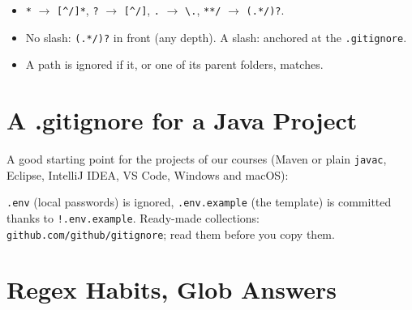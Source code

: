 \documentclass[11pt,a4paper]{article}
\begin{document}

\begin{itemize}
  \item \texttt{*} $\to$ \texttt{[\textasciicircum/]*}, \texttt{?} $\to$ \texttt{[\textasciicircum/]}, \texttt{.} $\to$ \texttt{\textbackslash.}, \texttt{**/} $\to$ \texttt{(.*/)?}.
  \item No slash: \texttt{(.*/)?} in front (any depth). A slash: anchored at the \texttt{.gitignore}.
  \item A path is ignored if it, or one of its parent folders, matches.
\end{itemize}



\section{A .gitignore for a Java Project}


A good starting point for the projects of our courses (Maven or plain \texttt{javac}, Eclipse, IntelliJ IDEA, VS Code, Windows and macOS):

\noindent
\begin{minipage}[t]{0.42\linewidth}

\end{minipage}\hfill
\begin{minipage}[t]{0.56\linewidth}

\end{minipage}

\texttt{.env} (local passwords) is ignored, \texttt{.env.example} (the template) is committed thanks to \texttt{!.env.example}.
Ready-made collections: \texttt{github.com/github/gitignore}; read them before you copy them.



\section{Regex Habits, Glob Answers}
\end{document}
